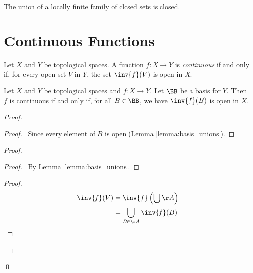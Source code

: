 \begin{corollary}
    \label{corollary:union_locally_finite_closed}
    The union of a locally finite family of closed sets is closed.
\end{corollary}

\section{Continuous Functions}

\begin{definition}[Continuous]
    Let $X$ and $Y$ be topological spaces. A function $f : X \rightarrow Y$ is \emph{continuous} if and only
    if, for every open set $V$ in $Y$, the set $\inv{f}(V)$ is open in $X$.
\end{definition}

\begin{proposition}
    \label{proposition:continuous_basis}
    Let $X$ and $Y$ be topological spaces and $f : X \rightarrow Y$. Let $\BB$ be a basis for $Y$. Then $f$
    is continuous if and only if, for all $B \in \BB$, we have $\inv{f}(B)$ is open in $X$.
\end{proposition}

\begin{proof}
    \pf
    \begin{proof}
        \pf\ Since every element of $B$ is open (Lemma \ref{lemma:basis_unions}).
    \end{proof}
    \begin{proof}
        \begin{proof}
            \pf\ By Lemma \ref{lemma:basis_unions}.
        \end{proof}
        \begin{proof}
            \pf
            \begin{align*}
                \inv{f}(V) & = \inv{f} \left( \bigcup \AA \right) \\
                & = \bigcup_{B \in \AA} \inv{f}(B)
            \end{align*}
        \end{proof}
    \end{proof}
    \qed
\end{proof}

